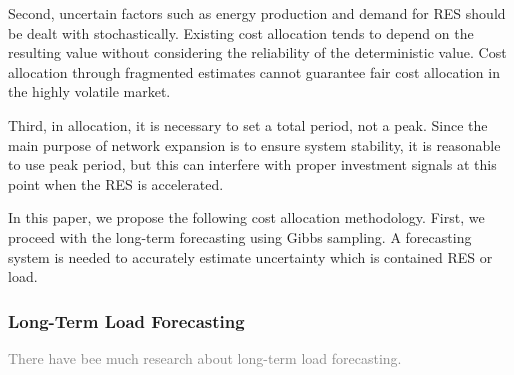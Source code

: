 \documentclass[journal]{IEEEtran} %
\begin{document}
Second, uncertain factors such as energy production and demand for RES should be dealt with stochastically. Existing cost allocation tends to depend on the resulting value without considering the reliability of the deterministic value. Cost allocation through fragmented estimates cannot guarantee fair cost allocation in the highly volatile market. 

Third, in allocation, it is necessary to set a total period, not a peak. Since the main purpose of network expansion is to ensure system stability, it is reasonable to use peak period, but this can interfere with proper investment signals at this point when the RES is accelerated.

In this paper, we propose the following cost allocation methodology. First, we proceed with the long-term forecasting using Gibbs sampling. A forecasting system is needed to accurately estimate uncertainty which is contained RES or load. 


%
%
%
%
%
%
%
%
%








\vspace{1.2in}














\subsubsection{Long-Term Load Forecasting}
\textcolor{gray}{There have bee much research about long-term load forecasting.}
\end{document}
